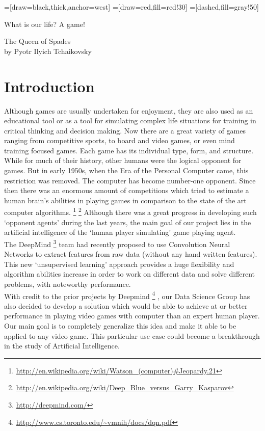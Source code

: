 \documentclass[a4paper,oneside,dvipsnames]{article}
\begin{document}

=[draw=black,thick,anchor=west]
=[draw=red,fill=red!30]
=[dashed,fill=gray!50]
\tableofcontents
\newpage

\epigraph{What is our life? A game!}{The Queen of Spades\\ by Pyotr Ilyich Tchaikovsky}


\section[Introduction]{Introduction}

Although games are usually undertaken for enjoyment, they are also used as an educational tool or as a tool for simulating complex life situations for training in critical thinking and decision making. Now there are a great variety of games ranging from competitive sports, to board and video games, or even mind training focused games. Each game has its individual type, form, and structure.
\\

While for much of their history, other humans were the logical opponent for games. But in early 1950s, when the Era of the Personal Computer came, this restriction was removed. The computer has become number-one opponent. Since then there was an enormous amount of competitions which tried to estimate a human brain’s abilities in playing games in comparison to the state of the art computer algorithms. 
\footnote{\url{http://en.wikipedia.org/wiki/Watson\_(computer)\#Jeopardy.21}}
\footnote{\url{http://en.wikipedia.org/wiki/Deep\_Blue\_versus\_Garry\_Kasparov}}
Although there was a great progress in developing such ‘opponent agents’ during the last years, the main goal of our project lies in the artificial intelligence of the `human player simulating' game playing agent.
\\

The DeepMind
\footnote{\url{http://deepmind.com/}} 
team had recently proposed to use Convolution Neural Networks to extract features from raw data (without any hand written features). This new `unsupervised learning' approach provides a huge flexibility and algorithm abilities increase in order to work on different data and solve different problems, with noteworthy performance. \\

With credit to the prior projects by Deepmind
\footnote{\url{http://www.cs.toronto.edu/\~vmnih/docs/dqn.pdf}}
, our Data Science Group has also decided to develop a solution which would be able to achieve at or better performance in playing video games with computer than an expert human player. Our main goal is to completely generalize this idea and make it able to be applied to any video game. This particular use case could become a breakthrough in the study of Artificial Intelligence.
\end{document}
